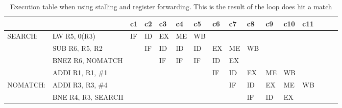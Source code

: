 \begin{landscape}

    \begin{table}[]
    \centering
    \begin{tabular}{llllllllllllllll}
    \hline
             &                                         & c1 & c2 & c3 & c4 & c5 & c6 & c7 & c8 & c9 & c10 & c11 \\ \hline
    SEARCH:  & \multicolumn{1}{l|}{LW R5, 0(R3)}       & IF & ID & EX & ME & WB &    &    &    &    &     &     \\
             & \multicolumn{1}{l|}{SUB R6, R5, R2}     &    & IF & ID & ID & ID & EX & ME & WB &    &     &     \\
             & \multicolumn{1}{l|}{BNEZ R6, NOMATCH}   &    &    & IF & IF & IF & ID & EX &    &    &     &     \\
             & \multicolumn{1}{l|}{ADDI R1, R1, \#1}   &    &    &    &    &    & IF & ID & EX & ME & WB  &     \\
    NOMATCH: & \multicolumn{1}{l|}{ADDI R3, R3, \#4}   &    &    &    &    &    &    & IF & ID & EX & ME  & WB  \\
             & \multicolumn{1}{l|}{BNE R4, R3, SEARCH} &    &    &    &    &    &    &    & IF & ID & EX  &     \\ \hline
    \end{tabular}
    \caption{Execution table when using stalling and register forwarding. This is the result of the loop does hit a match}
    \label{tab:t21chit}
    \end{table}


\end{landscape}
